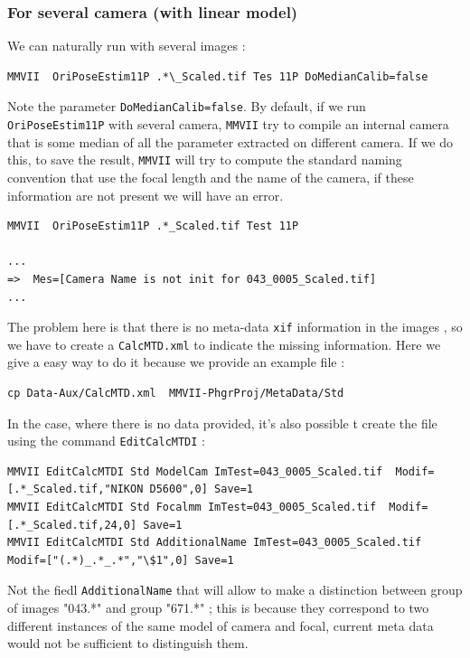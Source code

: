 \subsubsection{For several camera (with linear model)}

We can naturally run with several images :

\begin{lstlisting}
MMVII  OriPoseEstim11P .*\_Scaled.tif Tes 11P DoMedianCalib=false
\end{lstlisting}

Note the parameter {\tt DoMedianCalib=false}. By default, if we run  {\tt OriPoseEstim11P}
with several camera, {\tt MMVII} try to compile an internal camera that is some median of 
all the parameter extracted on different camera.  If we do this, to save the result, {\tt MMVII}
will try to compute the standard naming convention that use the focal length and
the name of the camera, if these information are not present we will have an error.

\begin{lstlisting}
MMVII  OriPoseEstim11P .*_Scaled.tif Test 11P

...
=>  Mes=[Camera Name is not init for 043_0005_Scaled.tif]
...
\end{lstlisting}


The problem here is that there is no meta-data {\tt xif} information in the images , so we have to
create a {\tt CalcMTD.xml} to indicate the missing information.
Here we give a easy way to do it because we provide an example file : 

\begin{lstlisting}
cp Data-Aux/CalcMTD.xml  MMVII-PhgrProj/MetaData/Std
\end{lstlisting}

In the case, where there is no data provided, it's also possible t create the file
using the command {\tt EditCalcMTDI} :

\begin{lstlisting}
MMVII EditCalcMTDI Std ModelCam ImTest=043_0005_Scaled.tif  Modif=[.*_Scaled.tif,"NIKON D5600",0] Save=1
MMVII EditCalcMTDI Std Focalmm ImTest=043_0005_Scaled.tif  Modif=[.*_Scaled.tif,24,0] Save=1
MMVII EditCalcMTDI Std AdditionalName ImTest=043_0005_Scaled.tif  Modif=["(.*)_.*_.*","\$1",0] Save=1
\end{lstlisting}

Not the fiedl {\tt AdditionalName} that will allow to make a distinction between group of
images "043.*" and group "671.*" ; this is because
they correspond to two different instances of the same model of camera and focal, current meta data would
not be sufficient to distinguish them.

